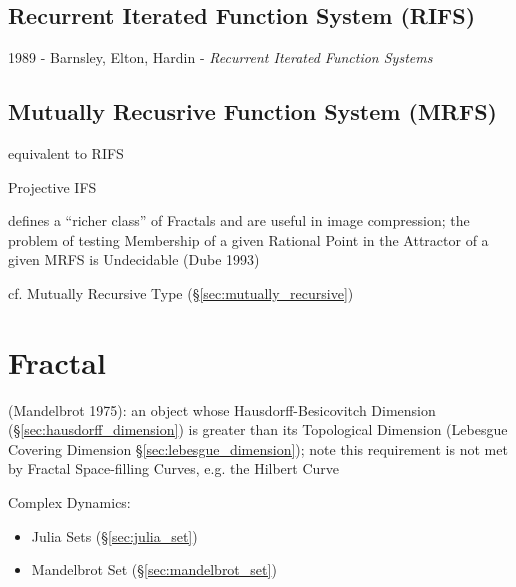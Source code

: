 \subsection{Recurrent Iterated Function System (RIFS)}\label{sec:rifs}

1989 - Barnsley, Elton, Hardin - \emph{Recurrent Iterated Function Systems}



\subsection{Mutually Recusrive Function System (MRFS)}\label{sec:mrfs}

equivalent to RIFS

Projective IFS

defines a ``richer class'' of Fractals and are useful in image compression; the
problem of testing Membership of a given Rational Point in the Attractor of a
given MRFS is Undecidable (Dube 1993)

cf. Mutually Recursive Type (\S\ref{sec:mutually_recursive})



\section{Fractal}\label{sec:fractal}

(Mandelbrot 1975): an object whose Hausdorff-Besicovitch Dimension
(\S\ref{sec:hausdorff_dimension}) is greater than its Topological Dimension
(Lebesgue Covering Dimension \S\ref{sec:lebesgue_dimension}); note this
requirement is not met by Fractal Space-filling Curves, e.g. the Hilbert Curve

Complex Dynamics:
\begin{itemize}
  \item Julia Sets (\S\ref{sec:julia_set})
  \item Mandelbrot Set (\S\ref{sec:mandelbrot_set})
\end{itemize}


